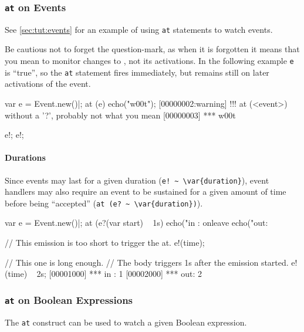 \subsubsection{\lstinline{at} on Events}
\label{sec:lang:at:ev}

See \autoref{sec:tut:events} for an example of using \lstinline{at}
statements to watch events.

Be cautious not to forget the question-mark, as when it is forgotten it
means that you mean to monitor changes to , not its activations.
In the following example \lstinline{e} is ``true'', so the \lstinline{at}
statement fires immediately, but remains still on later activations of the
event.

\begin{urbiscript}
var e = Event.new()|;
at (e) echo("w00t");
[00000002:warning] !!! at (<event>) without a '?', probably not what you mean
[00000003] *** w00t

e!;
e!;
\end{urbiscript}

\paragraph{Durations}

Since events may last for a given duration
(\lstinline|e! ~ \var{duration}|),
event handlers may also require an event to be sustained for a given amount
of time before being ``accepted'' (\lstinline|at (e? ~ \var{duration})|).

\begin{urbiscript}[firstnumber=1]
var e = Event.new()|;
at (e?(var start) ~ 1s)
  echo("in : %
onleave
  echo("out: %

// This emission is too short to trigger the at.
e!(time);

// This one is long enough.
// The body triggers 1s after the emission started.
e!(time) ~ 2s;
[00001000] *** in : 1
[00002000] *** out: 2
\end{urbiscript}


\subsubsection{\lstinline{at} on Boolean Expressions}
\label{sec:lang:at:exp}

The \lstinline{at} construct can be used to watch a given Boolean
expression.

